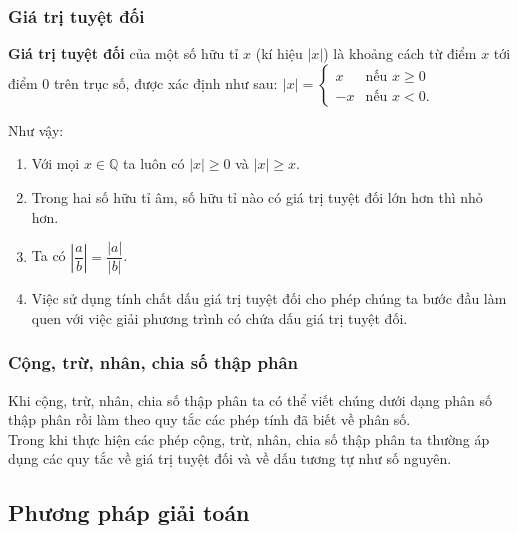 \subsubsection{Giá trị tuyệt đối}
	\textbf{Giá trị tuyệt đối} của một số hữu tỉ $ x $ (kí hiệu $ |x| $) là khoảng cách từ điểm $ x $ tới điểm $ 0 $ trên trục số, được xác định như sau$ \colon\ |x|=\begin{cases}
	x&\text{nếu }x\geq 0\\
	-x&\text{nếu }x< 0.
	\end{cases} $
	\begin{note}
		Như vậy:
		\begin{enumerate}[1)]
		\item Với mọi $ x\in\mathbb{Q} $ ta luôn có $ |x|\geq 0 $ và $ |x|\geq x $.
		\item Trong hai số hữu tỉ âm, số hữu tỉ nào có giá trị tuyệt đối lớn hơn thì nhỏ hơn.
		\item Ta có $ \left|\dfrac{a}{b}\right|=\dfrac{|a|}{|b|} $.
		\item Việc sử dụng tính chất dấu giá trị tuyệt đối cho phép chúng ta bước đầu làm quen với việc giải phương trình có chứa dấu giá trị tuyệt đối.
		\end{enumerate}
	\end{note}
\subsubsection{Cộng, trừ, nhân, chia số thập phân}
	Khi cộng, trừ, nhân, chia số thập phân ta có thể viết chúng dưới dạng phân số thập phân rồi làm theo quy tắc các phép tính đã biết về phân số.\\
	Trong khi thực hiện các phép cộng, trừ, nhân, chia số thập phân ta thường áp dụng các quy tắc về giá trị tuyệt đối và về dấu tương tự như số nguyên.
\subsection{Phương pháp giải toán}
